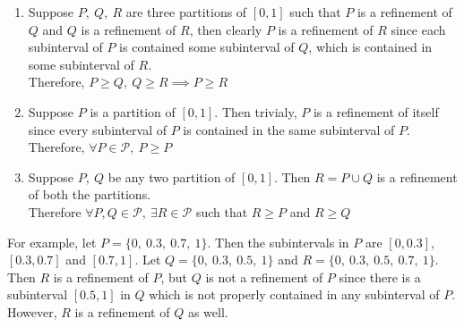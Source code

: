 \begin{remark}
\begin{enumerate}
		\begin{commentary}
		\begin{enumerate}
			\item Suppose \(P,\ Q,\ R \)  are three partitions of \( [0,1] \) such that \( P \) is a refinement of \( Q \) and \( Q \) is a refinement of \( R \), then clearly \( P \) is a refinement of \( R \) since each subinterval of \( P \) is contained some subinterval of \( Q \), which is contained in some subinterval of \( R \).\\
			Therefore, \( P \ge Q,\ Q \ge R \implies P \ge R \)
			\item Suppose \( P \) is a partition of \( [0,1] \).
				Then trivialy, \( P \) is a refinement of itself since every subinterval of \( P \) is contained in the same subinterval of \( P \).\\
			Therefore, \( \forall P \in \mathcal{P},\ P \ge P \)
			\item Suppose \( P,\ Q \) be any two partition of \( [0,1] \).
				Then \( R = P \cup Q \) is a refinement of both the partitions.\\
			Therefore \( \forall P,Q \in \mathcal{P},\ \exists R \in \mathcal{P} \) such that \( R \ge P \) and \( R \ge Q \)
		\end{enumerate}
		\end{commentary}
	\end{enumerate}
\begin{commentary}
	For example, let \( P = \{ 0,\ 0.3,\ 0.7,\ 1 \} \).
	Then the subintervals in \( P \) are \( [0,0.3] \), \( [0.3,0.7] \) and \( [0.7,1] \).
	Let \( Q = \{ 0,\ 0.3,\ 0.5,\ 1 \} \) and \( R = \{ 0,\ 0.3,\ 0.5,\ 0.7,\ 1 \} \).
	Then \( R \) is a refinement of \( P \), but \( Q \) is not a refinement of \( P \) since there is a subinterval \( [0.5,1] \) in \( Q \) which is not properly contained in any subinterval of \( P \).
	However, \( R \) is a refinement of \( Q \) as well.
\end{commentary}
\end{remark}

